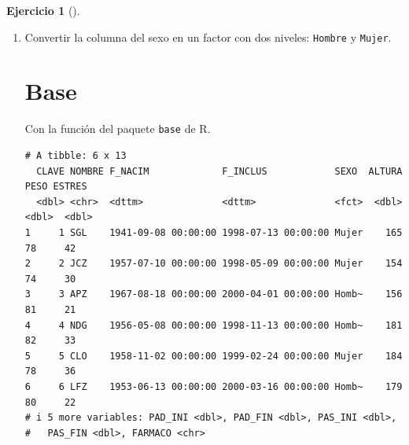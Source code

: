 \documentclass[
  a4paper,
]{scrreport}
\newenvironment{Shaded}{\begin{snugshade}}{\end{snugshade}}
\newcommand{\AttributeTok}[1]{\textcolor[rgb]{0.40,0.45,0.13}{#1}}
\newcommand{\DecValTok}[1]{\textcolor[rgb]{0.68,0.00,0.00}{#1}}
\newcommand{\FunctionTok}[1]{\textcolor[rgb]{0.28,0.35,0.67}{#1}}
\newcommand{\NormalTok}[1]{\textcolor[rgb]{0.00,0.23,0.31}{#1}}
\newcommand{\OtherTok}[1]{\textcolor[rgb]{0.00,0.23,0.31}{#1}}
\newcommand{\SpecialCharTok}[1]{\textcolor[rgb]{0.37,0.37,0.37}{#1}}
\newcommand{\StringTok}[1]{\textcolor[rgb]{0.13,0.47,0.30}{#1}}
\theoremstyle{definition}
\newtheorem{exercise}{Ejercicio}[chapter]
\theoremstyle{remark}
\begin{document}
\begin{exercise}[]
\begin{enumerate}
\begin{tcolorbox}
  \end{tcolorbox}
\item
  Convertir la columna del sexo en un factor con dos niveles:
  \texttt{Hombre} y \texttt{Mujer}.

  \begin{tcolorbox}[enhanced jigsaw, breakable, toptitle=1mm, colbacktitle=quarto-callout-tip-color!10!white, rightrule=.15mm, opacityback=0, opacitybacktitle=0.6, titlerule=0mm, coltitle=black, colframe=quarto-callout-tip-color-frame, colback=white, bottomtitle=1mm, leftrule=.75mm, toprule=.15mm, title=\textcolor{quarto-callout-tip-color}{\faLightbulb}\hspace{0.5em}{Solución}, arc=.35mm, bottomrule=.15mm, left=2mm]

  \section{Base}

  Con la función del paquete \texttt{base} de R.

\begin{Shaded}
\end{Shaded}

\begin{verbatim}
# A tibble: 6 x 13
  CLAVE NOMBRE F_NACIM             F_INCLUS            SEXO  ALTURA  PESO ESTRES
  <dbl> <chr>  <dttm>              <dttm>              <fct>  <dbl> <dbl>  <dbl>
1     1 SGL    1941-09-08 00:00:00 1998-07-13 00:00:00 Mujer    165    78     42
2     2 JCZ    1957-07-10 00:00:00 1998-05-09 00:00:00 Mujer    154    74     30
3     3 APZ    1967-08-18 00:00:00 2000-04-01 00:00:00 Homb~    156    81     21
4     4 NDG    1956-05-08 00:00:00 1998-11-13 00:00:00 Homb~    181    82     33
5     5 CLO    1958-11-02 00:00:00 1999-02-24 00:00:00 Mujer    184    78     36
6     6 LFZ    1953-06-13 00:00:00 2000-03-16 00:00:00 Homb~    179    80     22
# i 5 more variables: PAD_INI <dbl>, PAD_FIN <dbl>, PAS_INI <dbl>,
#   PAS_FIN <dbl>, FARMACO <chr>
\end{verbatim}


\end{tcolorbox}
\end{enumerate}
\end{exercise}
\end{document}
